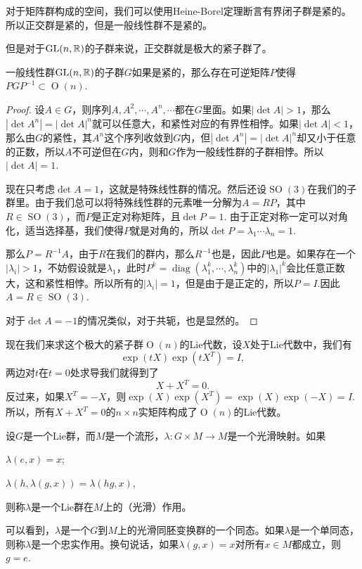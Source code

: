 \begin{pro}
对于矩阵群构成的空间，我们可以使用Heine-Borel定理断言有界闭子群是紧的。所以正交群是紧的，但是一般线性群不是紧的。
\end{pro}

但是对于$\operatorname{GL}(n,\mathbb{R})$的子群来说，正交群就是极大的紧子群了。

\begin{pro}
一般线性群$\operatorname{GL}(n,\mathbb{R})$的子群$G$如果是紧的，那么存在可逆矩阵$P$使得$PGP^{-1}\subset \operatorname{O}(n)$.
\end{pro} 

\begin{proof}
设$A\in G$，则序列$A,A^2,\cdots,A^n,\cdots$都在$G$里面。如果$|\det A|>1$，那么$|\det A^n|=|\det A|^n$就可以任意大，和紧性对应的有界性相悖。如果$|\det A|<1$，那么由$G$的紧性，其$A^n$这个序列收敛到$G$内，但$|\det A^n|=|\det A|^n$却又小于任意的正数，所以$A$不可逆但在$G$内，则和$G$作为一般线性群的子群相悖。所以$|\det A|=1$.

现在只考虑$\det A=1$，这就是特殊线性群的情况。然后还设$\operatorname{SO}(3)$在我们的子群里。由于我们总可以将特殊线性群的元素唯一分解为$A=RP$，其中$R\in \operatorname{SO}(3)$，而$P$是正定对称矩阵，且$\det P=1$. 由于正定对称一定可以对角化，适当选择基，我们使得$P$就是对角的，所以$\det P=\lambda_1\cdots\lambda_n=1$.

那么$P=R^{-1}A$，由于$R$在我们的群内，那么$R^{-1}$也是，因此$P$也是。如果存在一个$|\lambda_i|>1$，不妨假设就是$\lambda_1$，此时$P^{k}=\operatorname{diag}(\lambda_1^k,\cdots,\lambda_n^k)$中的$|\lambda_1|^k$会比任意正数大，这和紧性相悖。所以所有的$|\lambda_i|=1$，但是由于是正定的，所以$P=I$.因此$A=R\in\operatorname{SO}(3)$.

对于$\det A=-1$的情况类似，对于共轭，也是显然的。 
\end{proof}

现在我们来求这个极大的紧子群$\operatorname{O}(n)$的Lie代数，设$X$处于Lie代数中，我们有
\[
	\exp(tX)\exp(tX^T)=I,
\]
两边对$t$在$t=0$处求导我们就得到了
\[
	X+X^T=0.
\]
反过来，如果$X^T=-X$，则$\exp(X)\exp(X^T)=\exp(X)\exp(-X)=I$. 所以，所有$X+X^T=0$的$n\times n$实矩阵构成了$\operatorname{O}(n)$的Lie代数。

\begin{para}[Lie群作用]
设$G$是一个Lie群，而$M$是一个流形，$\lambda:G\times M\to M$是一个光滑映射。如果
\begin{compactenum}
\item $\lambda(e,x)=x$;
\item $\lambda(h,\lambda(g,x))=\lambda(hg,x)$,
\end{compactenum}
则称$\lambda$是一个Lie群在$M$上的（光滑）作用。

可以看到，$\lambda$是一个$G$到$M$上的光滑同胚变换群的一个同态。如果$\lambda$是一个单同态，则称$\lambda$是一个忠实作用。换句说话，如果$\lambda(g,x)=x$对所有$x\in M$都成立，则$g=e$. 
\end{para}

